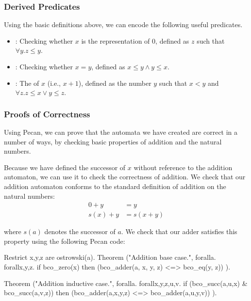 

\subsubsection{Derived Predicates}

Using the basic definitions above, we can encode the following useful predicates.

\begin{itemize}
    \item {}: Checking whether $x$ is the representation of $0$, defined as $z$ such that $\forall y. z \leq y$.
    
    \item {}: Checking whether $x = y$, defined as $x \leq y \land y \leq x$.
    
    \item {}: The  of $x$ (i.e., $x + 1$), defined as the number $y$ such that $x < y$ and $\forall z. z \leq x \lor y \leq z$.
\end{itemize}

\subsubsection{Proofs of Correctness}

Using Pecan, we can prove that the automata we have created are correct in a number of ways, by checking basic properties of addition and the natural numbers.

Because we have defined the successor of $x$ without reference to the addition automaton, we can use it to check the correctness of addition.
We check that our addition automaton conforms to the standard definition of addition on the natural numbers:
\begin{align*}
    0 + y &= y \\
    s(x) + y &= s(x + y)
\end{align*}

where $s(a)$ denotes the successor of $a$.
We check that our adder satisfies this property using the following Pecan code:

\begin{pecan}
Restrict x,y,z are ostrowski(a).
Theorem ("Addition base case.", {
    foralla. forallx,y,z. 
    if bco_zero(x) then 
        (bco_adder(a, x, y, z) <=> bco_eq(y, z))
}).

Theorem ("Addition inductive case.", {
    foralla. forallx,y,z,u,v. 
    if (bco_succ(a,u,x) & bco_succ(a,v,z)) then 
        (bco_adder(a,x,y,z) <=> bco_adder(a,u,y,v))
}).
\end{pecan}

